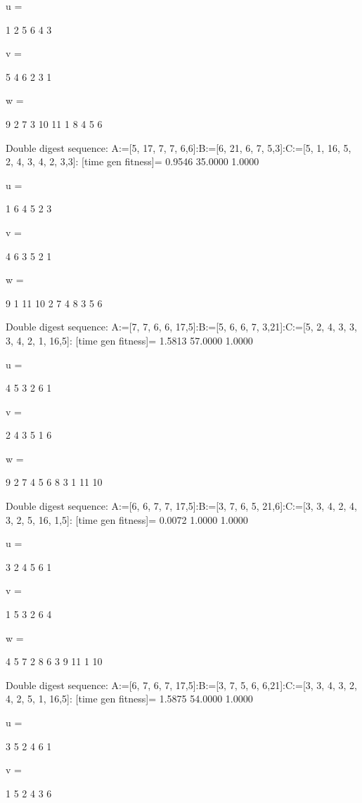 u =

     1     2     5     6     4     3


v =

     5     4     6     2     3     1


w =

     9     2     7     3    10    11     1     8     4     5     6

Double digest sequence:
A:=[5, 17, 7, 7, 6,6]:B:=[6, 21, 6, 7, 5,3]:C:=[5, 1, 16, 5, 2, 4, 3, 4, 2, 3,3]:
[time gen fitness]=
    0.9546   35.0000    1.0000


u =

     1     6     4     5     2     3


v =

     4     6     3     5     2     1


w =

     9     1    11    10     2     7     4     8     3     5     6

Double digest sequence:
A:=[7, 7, 6, 6, 17,5]:B:=[5, 6, 6, 7, 3,21]:C:=[5, 2, 4, 3, 3, 3, 4, 2, 1, 16,5]:
[time gen fitness]=
    1.5813   57.0000    1.0000


u =

     4     5     3     2     6     1


v =

     2     4     3     5     1     6


w =

     9     2     7     4     5     6     8     3     1    11    10

Double digest sequence:
A:=[6, 6, 7, 7, 17,5]:B:=[3, 7, 6, 5, 21,6]:C:=[3, 3, 4, 2, 4, 3, 2, 5, 16, 1,5]:
[time gen fitness]=
    0.0072    1.0000    1.0000


u =

     3     2     4     5     6     1


v =

     1     5     3     2     6     4


w =

     4     5     7     2     8     6     3     9    11     1    10

Double digest sequence:
A:=[6, 7, 6, 7, 17,5]:B:=[3, 7, 5, 6, 6,21]:C:=[3, 3, 4, 3, 2, 4, 2, 5, 1, 16,5]:
[time gen fitness]=
    1.5875   54.0000    1.0000


u =

     3     5     2     4     6     1


v =

     1     5     2     4     3     6


